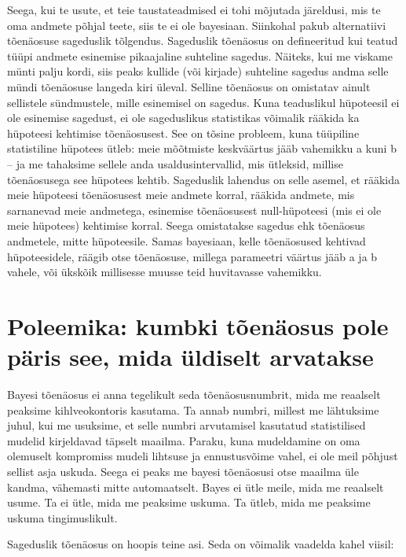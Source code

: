 \documentclass[]{book}
\begin{document}
Seega, kui te usute, et teie taustateadmised ei tohi mõjutada järeldusi,
mis te oma andmete põhjal teete, siis te ei ole bayesiaan. Siinkohal
pakub alternatiivi tõenäosuse sageduslik tõlgendus. Sageduslik tõenäosus
on defineeritud kui teatud tüüpi andmete esinemise pikaajaline suhteline
sagedus. Näiteks, kui me viskame münti palju kordi, siis peaks kullide
(või kirjade) suhteline sagedus andma selle mündi tõenäosuse langeda
kiri üleval. Selline tõenäosus on omistatav ainult sellistele
sündmustele, mille esinemisel on sagedus. Kuna teaduslikul hüpoteesil ei
ole esinemise sagedust, ei ole sageduslikus statistikas võimalik rääkida
ka hüpoteesi kehtimise tõenäosusest. See on tõsine probleem, kuna
tüüpiline statistiline hüpotees ütleb: meie mõõtmiste keskväärtus jääb
vahemikku a kuni b -- ja me tahaksime sellele anda usaldusintervallid,
mis ütleksid, millise tõenäosusega see hüpotees kehtib. Sageduslik
lahendus on selle asemel, et rääkida meie hüpoteesi tõenäosusest meie
andmete korral, rääkida andmete, mis sarnanevad meie andmetega,
esinemise tõenäosusest null-hüpoteesi (mis ei ole meie hüpotees)
kehtimise korral. Seega omistatakse sagedus ehk tõenäosus andmetele,
mitte hüpoteesile. Samas bayesiaan, kelle tõenäosused kehtivad
hüpoteesidele, räägib otse tõenäosuse, millega parameetri väärtus jääb a
ja b vahele, või ükskõik millisesse muusse teid huvitavasse vahemikku.

\section*{Poleemika: kumbki tõenäosus pole päris see, mida üldiselt
arvatakse}\label{poleemika-kumbki-toenaosus-pole-paris-see-mida-uldiselt-arvatakse}

Bayesi tõenäosus ei anna tegelikult seda tõenäosusnumbrit, mida me
reaalselt peaksime kihlveokontoris kasutama. Ta annab numbri, millest me
lähtuksime juhul, kui me usuksime, et selle numbri arvutamisel kasutatud
statistilised mudelid kirjeldavad täpselt maailma. Paraku, kuna
mudeldamine on oma olemuselt kompromiss mudeli lihtsuse ja ennustusvõime
vahel, ei ole meil põhjust sellist asja uskuda. Seega ei peaks me bayesi
tõenäosusi otse maailma üle kandma, vähemasti mitte automaatselt. Bayes
ei ütle meile, mida me reaalselt usume. Ta ei ütle, mida me peaksime
uskuma. Ta ütleb, mida me peaksime uskuma tingimuslikult.

Sageduslik tõenäosus on hoopis teine asi. Seda on võimalik vaadelda
kahel viisil:
\end{document}
